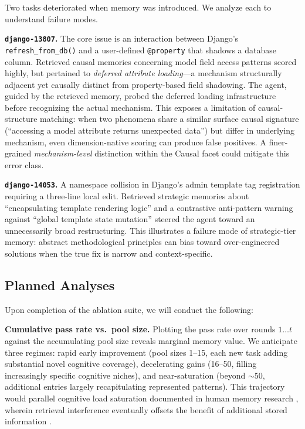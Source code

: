 \documentclass[letterpaper]{article} %
\begin{document}
Two tasks deteriorated when memory was introduced. We analyze each to understand failure modes.

\textbf{\texttt{django-13807}.} The core issue is an interaction between Django's \texttt{refresh\_from\_db()} and a user-defined \texttt{@property} that shadows a database column. Retrieved causal memories concerning model field access patterns scored highly, but pertained to \emph{deferred attribute loading}---a mechanism structurally adjacent yet causally distinct from property-based field shadowing. The agent, guided by the retrieved memory, probed the deferred loading infrastructure before recognizing the actual mechanism. This exposes a limitation of causal-structure matching: when two phenomena share a similar surface causal signature (``accessing a model attribute returns unexpected data'') but differ in underlying mechanism, even dimension-native scoring can produce false positives. A finer-grained \emph{mechanism-level} distinction within the Causal facet could mitigate this error class.

\textbf{\texttt{django-14053}.} A namespace collision in Django's admin template tag registration requiring a three-line local edit. Retrieved strategic memories about ``encapsulating template rendering logic'' and a contrastive anti-pattern warning against ``global template state mutation'' steered the agent toward an unnecessarily broad restructuring. This illustrates a failure mode of strategic-tier memory: abstract methodological principles can bias toward over-engineered solutions when the true fix is narrow and context-specific.

\subsection{Planned Analyses}

Upon completion of the ablation suite, we will conduct the following:

\textbf{Cumulative pass rate vs.\ pool size.} Plotting the pass rate over rounds $1 \ldots t$ against the accumulating pool size reveals marginal memory value. We anticipate three regimes: rapid early improvement (pool sizes 1--15, each new task adding substantial novel cognitive coverage), decelerating gains (16--50, filling increasingly specific cognitive niches), and near-saturation (beyond $\sim$50, additional entries largely recapitulating represented patterns). This trajectory would parallel cognitive load saturation documented in human memory research \cite{cognitive-load}, wherein retrieval interference eventually offsets the benefit of additional stored information \cite{ctim-rover}.
\end{document}
